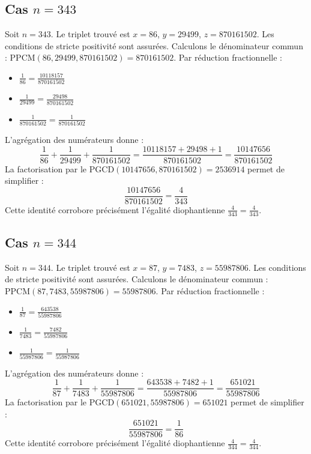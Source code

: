\documentclass[11pt,a4paper]{article}
\begin{document}
\subsection{Cas $n = 343$}
Soit $n = 343$. Le triplet trouvé est $x = 86$, $y = 29499$, $z = 870161502$.
Les conditions de stricte positivité sont assurées.
Calculons le dénominateur commun : $\text{PPCM}(86, 29499, 870161502) = 870161502$.
Par réduction fractionnelle :
\begin{itemize}
    \item $\frac{1}{86} = \frac{10118157}{870161502}$
    \item $\frac{1}{29499} = \frac{29498}{870161502}$
    \item $\frac{1}{870161502} = \frac{1}{870161502}$
\end{itemize}
L'agrégation des numérateurs donne :
$$ \frac{1}{86} + \frac{1}{29499} + \frac{1}{870161502} = \frac{10118157 + 29498 + 1}{870161502} = \frac{10147656}{870161502} $$
La factorisation par le $\text{PGCD}(10147656, 870161502) = 2536914$ permet de simplifier :
$$ \frac{10147656}{870161502} = \frac{4}{343} $$
Cette identité corrobore précisément l'égalité diophantienne $\frac{4}{343} = \frac{4}{343}$.

\subsection{Cas $n = 344$}
Soit $n = 344$. Le triplet trouvé est $x = 87$, $y = 7483$, $z = 55987806$.
Les conditions de stricte positivité sont assurées.
Calculons le dénominateur commun : $\text{PPCM}(87, 7483, 55987806) = 55987806$.
Par réduction fractionnelle :
\begin{itemize}
    \item $\frac{1}{87} = \frac{643538}{55987806}$
    \item $\frac{1}{7483} = \frac{7482}{55987806}$
    \item $\frac{1}{55987806} = \frac{1}{55987806}$
\end{itemize}
L'agrégation des numérateurs donne :
$$ \frac{1}{87} + \frac{1}{7483} + \frac{1}{55987806} = \frac{643538 + 7482 + 1}{55987806} = \frac{651021}{55987806} $$
La factorisation par le $\text{PGCD}(651021, 55987806) = 651021$ permet de simplifier :
$$ \frac{651021}{55987806} = \frac{1}{86} $$
Cette identité corrobore précisément l'égalité diophantienne $\frac{4}{344} = \frac{4}{344}$.
\end{document}
